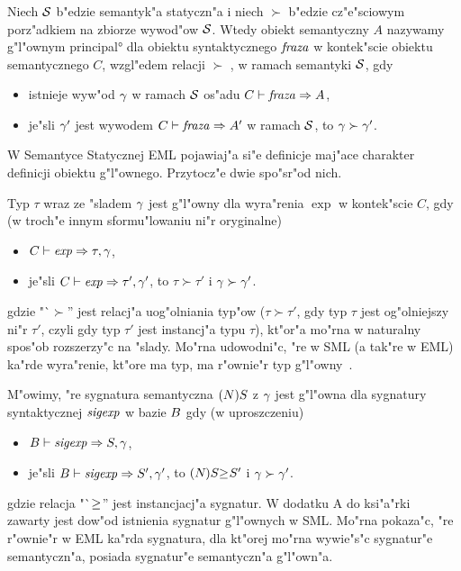 \subsubsection{\secprincipal}
\label{sec:principal}

Niech $\mbox{$\cal S$}$ b"edzie semantyk"a statyczn"a 
i niech $\succ$ b"edzie cz"e"sciowym porz"adkiem na zbiorze wywod"ow $\mbox{$\cal S$}$.
Wtedy obiekt semantyczny $A$ nazywamy g"l"ownym \ang{principal} dla obiektu syntaktycznego ${\it fraza}$
w kontek"scie obiektu semantycznego $C$, wzgl"edem relacji $\succ$ , 
w ramach semantyki $\mbox{$\cal S$}$, gdy
\begin{itemize}
\item istnieje wyw"od $\gamma$ w ramach $\mbox{$\cal S$}$ os"adu $C\vdash{\it fraza}\Rightarrow A$, 
\item je"sli $\gamma'$ jest wywodem $C\vdash{\it fraza}\Rightarrow A'$ w ramach $\mbox{$\cal S$}$, 
      to $\gamma\succ\gamma'$.
\end{itemize}

W Semantyce Statycznej EML pojawiaj"a si"e definicje maj"ace charakter definicji obiektu g"l"ownego.
Przytocz"e dwie spo"sr"od nich.

Typ $\tau$ wraz ze "sladem $\gamma$ jest g"l"owny dla wyra"renia $\exp$ w kontek"scie $C$,
gdy (w troch"e innym sformu"lowaniu ni"r oryginalne)
\begin{itemize}
\item $C\vdash{\it exp}\Rightarrow\tau,\gamma$, 
\item je"sli $C\vdash{\it exp}\Rightarrow\tau',\gamma'$, to
      $\tau\succ\tau'$ i $\gamma\succ\gamma'$.
\end{itemize} 
\pagebreak
gdzie "`$\succ$'' jest relacj"a uog"olniania typ"ow 
($\tau\succ\tau'$, gdy typ $\tau$ jest og"olniejszy ni"r $\tau'$,
czyli gdy typ $\tau'$ jest instancj"a typu $\tau$),
kt"or"a mo"rna w naturalny spos"ob rozszerzy"c na "slady.
Mo"rna udowodni"c, "re w SML (a tak"re w EML) ka"rde wyra"renie, 
kt"ore ma typ, ma r"ownie"r typ g"l"owny~\cite{Ler92}. 

M"owimy, "re sygnatura semantyczna $(N)S$ z $\gamma$ jest g"l"owna 
dla sygnatury syntaktycznej ${\it sigexp}$ w bazie $B$ 
gdy (w uproszczeniu)
\begin{itemize}
\item $B\vdash{\it sigexp}\Rightarrow S,\gamma$, 
\item je"sli $B\vdash{\it sigexp}\Rightarrow S',\gamma'$, to
      $(N_{})S_{} {\geq_{}} S'$ i $\gamma\succ\gamma'$.
\end{itemize}
gdzie relacja "`$\sigord{}{}$'' jest instancjacj"a sygnatur.
W dodatku A do ksi"a"rki~\cite{MT91} zawarty jest dow"od
istnienia sygnatur g"l"ownych w SML. Mo"rna pokaza"c,
"re r"ownie"r w EML ka"rda sygnatura, dla kt"orej mo"rna
wywie"s"c sygnatur"e semantyczn"a, posiada sygnatur"e semantyczn"a g"l"own"a.

